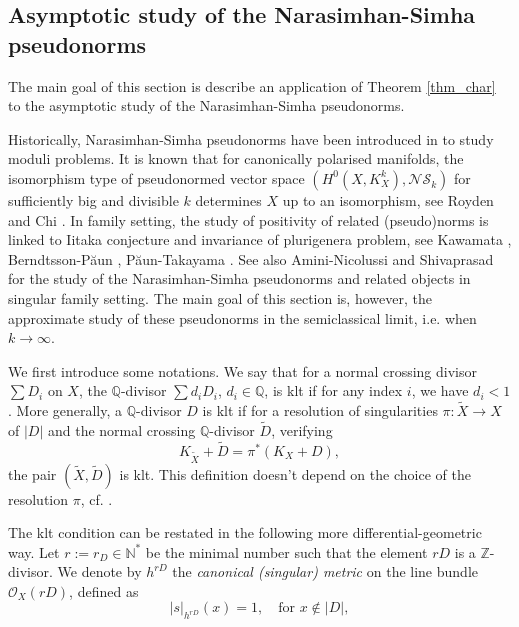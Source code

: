 \documentclass[12pt]{article}
\numberwithin{equation}{section}
\theoremstyle{theorem}
\theoremstyle{definition}
\theoremstyle{remark}
\newcommand{\nat}{\mathbb{N}}
\begin{document}
	\subsection{Asymptotic study of the Narasimhan-Simha pseudonorms}\label{sec_klt}
	The main goal of this section is describe an application of Theorem \ref{thm_char} to the asymptotic study of the Narasimhan-Simha pseudonorms.
	\par 
	Historically, Narasimhan-Simha pseudonorms have been introduced in \cite{NarSimh} to study moduli problems.
	It is known that for canonically polarised manifolds, the isomorphism type of pseudonormed vector space $(H^0(X, K_X^k), \mathcal{NS}_k)$ for sufficiently big and divisible $k$ determines $X$ up to an isomorphism, see Royden \cite[Theorem 1]{RoydenNS} and Chi \cite[Theorem 1.4]{ChiNSBir}.
	In family setting, the study of positivity of related (pseudo)norms is linked to Iitaka conjecture and invariance of plurigenera problem, see Kawamata \cite{KawamataNS}, Berndtsson-P{\u{a}}un \cite{BerndPaun}, P{\u{a}}un-Takayama \cite{PaunTakayama}.
	See also Amini-Nicolussi \cite{AminiNicol1} and Shivaprasad \cite{ShivaNS} for the study of the Narasimhan-Simha pseudonorms and related objects in singular family setting.
	The main goal of this section is, however, the approximate study of these pseudonorms in the semiclassical limit, i.e. when $k \to \infty$.
	\par 
	We first introduce some notations.
	We say that for a normal crossing divisor $\sum D_i$ on $X$, the $\mathbb{Q}$-divisor $\sum d_i D_i$, $d_i \in \mathbb{Q}$, is klt if for any index $i$, we have $d_i < 1$.
	More generally, a $\mathbb{Q}$-divisor $D$ is klt if for a resolution of singularities $\pi: \tilde{X} \to X$ of $|D|$ and the normal crossing $\mathbb{Q}$-divisor $\tilde{D}$, verifying 
	\begin{equation}
		K_{\tilde{X}} + \tilde{D} = \pi^*(K_X + D),
	\end{equation}
	the pair $(\tilde{X}, \tilde{D})$ is klt.
	This definition doesn't depend on the choice of the resolution $\pi$, cf. \cite[Lemma 3.10]{KollarPairs}.
	\par 
	The klt condition can be restated in the following more differential-geometric way.
	Let $r := r_D \in \nat^*$ be the minimal number such that the element $r D$ is a $\mathbb{Z}$-divisor.
	We denote by $h^{r D}$ the \textit{canonical (singular) metric} on the line bundle $\mathscr{O}_X(r D)$, defined as 
	\begin{equation}
		| s |_{h^{r D}}(x) = 1, \quad \text{for } x \notin |D|,
	\end{equation}
\end{document}

